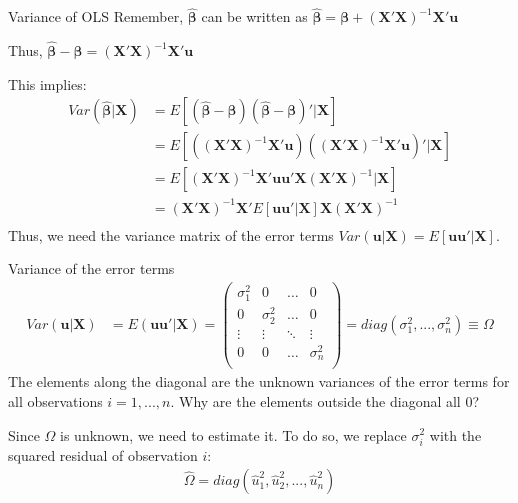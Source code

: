 \documentclass[11pt, aspectratio = 169]{beamer}
\begin{document}
\begin{frame}{Variance of OLS}
  Remember, $\hat{\boldsymbol{\beta}}$ can be written as $\hat{\boldsymbol{\beta}} = \boldsymbol{\beta} + (\mathbf{X}'\mathbf{X})^{-1}\mathbf{X}'\mathbf{u}$
  
Thus,  $\hat{\boldsymbol{\beta}} - \boldsymbol{\beta} = (\mathbf{X}'\mathbf{X})^{-1}\mathbf{X}'\mathbf{u}$

This implies: 
\begin{align*}
Var(\hat{\boldsymbol{\beta}}|\mathbf{X}) &= E[(\hat{\boldsymbol{\beta}}-\boldsymbol{\beta})(\hat{\boldsymbol{\beta}}-\boldsymbol{\beta})'|\mathbf{X}]\\
                            &= E[((\mathbf{X}'\mathbf{X})^{-1}\mathbf{X}'\mathbf{u})((\mathbf{X}'\mathbf{X})^{-1}\mathbf{X}'\mathbf{u})'|\mathbf{X}]\\
                            &= E[(\mathbf{X}'\mathbf{X})^{-1}\mathbf{X}'\mathbf{u}\mathbf{u}'\mathbf{X}(\mathbf{X}'\mathbf{X})^{-1}|\mathbf{X}]\\
                            &= (\mathbf{X}'\mathbf{X})^{-1}\mathbf{X}'E[\mathbf{u}\mathbf{u}'|\mathbf{X}]\mathbf{X}(\mathbf{X}'\mathbf{X})^{-1}\\
\end{align*}
Thus, we need the variance matrix of the error terms $Var(\mathbf{u}|\mathbf{X}) = E[\mathbf{u}\mathbf{u}'|\mathbf{X}]$.
\end{frame}


\begin{frame}{Variance of the error terms}
\begin{align*}
Var(\mathbf{u}|\mathbf{X}) &= E(\mathbf{u}\mathbf{u}'|\mathbf{X}) = \begin{pmatrix}
\sigma_1^2 & 0        & \ldots & 0     \\
0        & \sigma_2^2 & \ldots & 0     \\
\vdots   & \vdots   & \ddots & \vdots \\
0        &  0       & \ldots & \sigma_n^2 \\
\end{pmatrix} = diag(\sigma_1^2, ..., \sigma_n^2) \equiv \Omega
\end{align*}
The elements along the diagonal are the unknown variances of the error terms for all observations $i = 1,...,n.$
Why are the elements outside the diagonal all 0?

\pause

Since $\Omega$ is unknown, we need to estimate it. To do so, we replace $\sigma_i^2$ with the squared residual of observation $i$: \begin{align*}
\widehat{\Omega} = diag(\hat{u}_1^2, \hat{u}_2^2, ..., \hat{u}_n^2)
\end{align*}
\end{frame}
\end{document}
